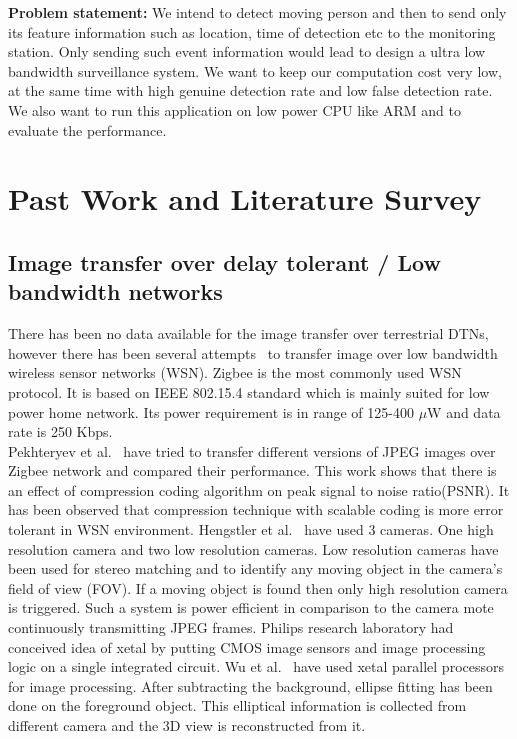 \indent \textbf{Problem statement:} We intend to detect moving person
and then to send only its feature information such as location, time of
detection etc to the monitoring station. Only sending such event
information would lead to design a ultra low bandwidth surveillance
system.  We want to keep our computation cost very low, at the same time
with high genuine detection rate and low false detection rate. We also
want to run this application on low power CPU like ARM and to evaluate
the performance.
\section{Past Work and Literature Survey}
\subsection{Image transfer over delay tolerant / Low bandwidth networks}
\indent There has been no data available for the image transfer over
terrestrial DTNs, however there has been several attempts~\cite{2, 3,
4, 5} to transfer image over low bandwidth wireless sensor networks
(WSN). Zigbee is the most commonly used WSN protocol. It is based on
IEEE 802.15.4 standard which is mainly suited for low power home
network. Its power requirement is in range of 125-400 $\mu$W and data
rate is 250 Kbps.\\
\indent Pekhteryev et al.~\cite{2} have tried to transfer different
versions of JPEG images over Zigbee network and compared their
performance. This work shows that there is an effect of compression
coding algorithm on peak signal to noise ratio(PSNR). It has been
observed that compression technique with scalable coding is more error
tolerant in WSN environment. Hengstler et al.~\cite{3, 5} have used 3
cameras. One high resolution camera and two low resolution cameras. Low
resolution cameras have been used for stereo matching and to identify
any moving object in the camera's field of view (FOV). If a moving
object is found then only high resolution camera is triggered. Such a
system is power efficient in  comparison to the camera mote continuously
transmitting JPEG frames. Philips research laboratory had conceived idea
of xetal by putting CMOS image sensors and image processing logic on a
single integrated circuit. Wu et al.~\cite{4} have used xetal parallel
processors for image processing. After subtracting the background,
ellipse fitting has been done on the foreground object. This elliptical
information is collected from different camera and the 3D view is
reconstructed from it.

